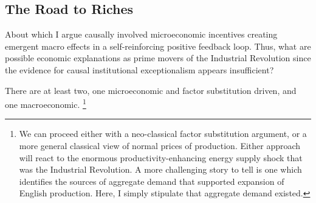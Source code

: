 \documentclass[12pt]{article}
\numberwithin{equation}{section}
\begin{document}
		

			
		\subsection*{The Road to Riches}
		
		About which I argue causally involved microeconomic incentives creating emergent macro effects in a self-reinforcing positive feedback loop. Thus, what are possible economic explanations as prime movers of the Industrial Revolution since the evidence for causal institutional exceptionalism appears insufficient?
		
		There are at least two, one microeconomic and factor substitution driven, and one macroeconomic. \footnote{We can proceed either with a neo-classical factor substitution argument, or a more general classical view of normal prices of production. Either approach will react to the enormous productivity-enhancing energy supply shock that was the Industrial Revolution. A more challenging story to tell is one which identifies the sources of aggregate demand that supported expansion of English production. Here, I simply stipulate that aggregate demand existed.}
		
\end{document}
